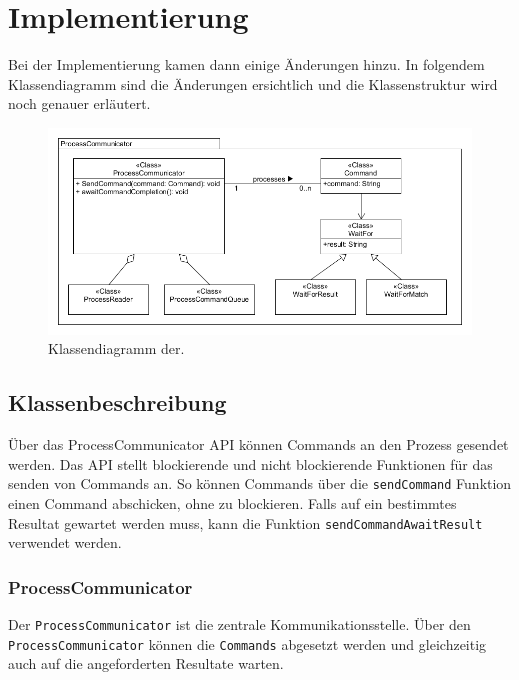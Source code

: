 \section{Implementierung}

Bei der Implementierung kamen dann einige Änderungen hinzu. In folgendem Klassendiagramm sind die Änderungen ersichtlich und die Klassenstruktur wird noch genauer erläutert.

\begin{figure}

	\centering
		\includegraphics[scale=0.75]{forthcommunication/communicator.png}
		\caption{Klassendiagramm der.}
		\label{fig:extensionpoint}

\end{figure}

\newpage

\subsection{Klassenbeschreibung}

Über das ProcessCommunicator API können Commands an den Prozess gesendet werden. Das API stellt blockierende und nicht blockierende Funktionen für das senden von Commands an. So können Commands über die \verb!sendCommand! Funktion einen Command abschicken, ohne zu blockieren. Falls auf ein bestimmtes Resultat gewartet werden muss, kann die Funktion \verb!sendCommandAwaitResult! verwendet werden. 

\subsubsection{ProcessCommunicator}

Der \verb!ProcessCommunicator! ist die zentrale Kommunikationsstelle. Über den \verb!ProcessCommunicator! können die \verb!Commands! abgesetzt werden und gleichzeitig auch auf die angeforderten Resultate warten.

